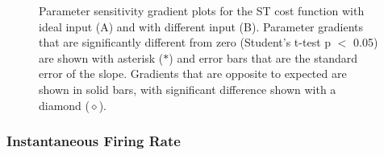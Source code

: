 % 
% 


\begin{figure}[th]
  \centering
  \caption{Parameter sensitivity gradient plots for the ST cost
    function with ideal input (A) and with different {\ANF} input
    (B). Parameter gradients that are significantly different from
    zero (Student's t-test p $<$ 0.05) are shown with asterisk
    ($\ast$) and error bars that are the standard error of the
    slope. Gradients that are opposite to expected are shown in
    solid bars, with significant difference shown with a diamond
    ($\diamond$).}
  \label{fig:GA:13}
\end{figure}

\subsubsection{Instantaneous Firing Rate}

